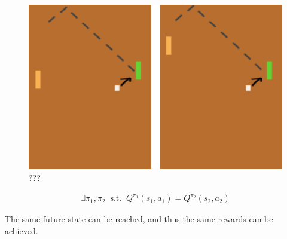\begin{figure}
\centering
\includegraphics[width=1\textwidth,height=0.25\textheight]{../../pictures/drawings/pong-reach.png}
\caption{???}
\end{figure}

\begin{align}
\exists \pi_1, \pi_2 \;\;\text{s.t.} \;\; Q^{\pi_1}(s_1, a_1) = Q^{\pi_2}(s_2, a_2)
\end{align}

The same future state can be reached, and thus the same rewards can be
achieved.
